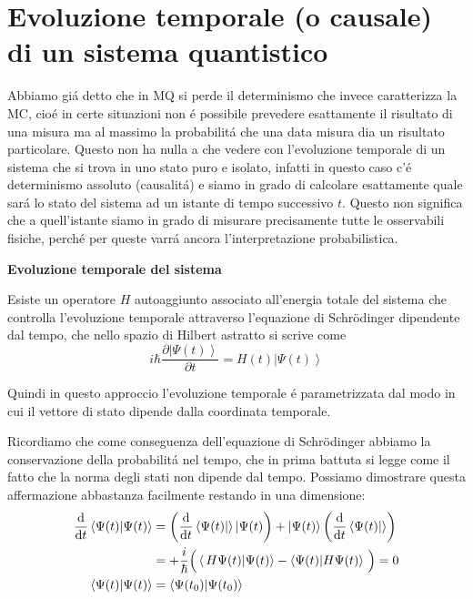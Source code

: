 \vspace{5em}
\section{\huge Evoluzione temporale (o causale) di un sistema quantistico}

Abbiamo gi\'a detto che in MQ si perde il determinismo che invece caratterizza la MC, cio\'e in certe situazioni non \'e possibile prevedere esattamente il risultato di una misura ma al massimo la probabilit\'a che una data misura dia un risultato particolare. Questo non ha nulla a che vedere con l'evoluzione temporale di un sistema che si trova in uno stato puro e isolato, infatti in questo caso c'\'e determinismo assoluto (causalit\'a) e siamo in grado di calcolare esattamente quale sar\'a lo stato del sistema ad un istante di tempo successivo $t$. Questo non significa che a quell'istante siamo in grado di misurare precisamente tutte le osservabili fisiche, perch\'e per queste varr\'a ancora l'interpretazione probabilistica.

\begin{postulato} \textbf{Evoluzione temporale del sistema}

	Esiste un operatore $H$ autoaggiunto associato all'energia totale del sistema che controlla l'evoluzione temporale attraverso l'equazione di Schr\"odinger dipendente dal tempo, che nello spazio di Hilbert astratto si scrive come
	\begin{equation} 
		i\hbar{\frac{\partial\left|\Psi(t)\right\rangle}{\partial t}}=H(t)\left|\Psi(t)\right\rangle
	\end{equation}
\end{postulato}

Quindi in questo approccio l'evoluzione temporale \'e parametrizzata dal modo in cui il vettore di stato dipende dalla coordinata temporale.

Ricordiamo che come conseguenza dell'equazione di Schr\"odinger abbiamo la conservazione della probabilit\'a nel tempo, che in prima battuta si legge come il fatto che la norma degli stati non dipende dal tempo. Possiamo dimostrare questa affermazione abbastanza facilmente restando in una dimensione:
\begin{align*}
	\frac{\mathrm{d}}{\mathrm{d}t}\left\langle\Psi(t)|\Psi(t)\right\rangle
	&=\left(\frac{\mathrm{d}}{\mathrm{d}t}\left\langle\Psi(t)|\right\rangle|\Psi(t)\right)+|\Psi(t)\rangle\left(\frac{\mathrm{d}}{\mathrm{d}t}\left\langle\Psi(t)|\right\rangle\right)
	\\ &=+\frac{i}{\hbar}\Big{(}\left\langle\,H\Psi(t)|\Psi(t)\right\rangle-\left\langle\Psi(t)|H\Psi(t)\right\rangle\,\Big{)}=0
	\\
	\left\langle\Psi(t)|\Psi(t)\right\rangle
	&=\left\langle\Psi(t_{0})|\Psi(t_{0})\right\rangle
\end{align*}

